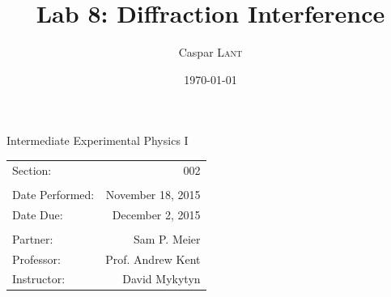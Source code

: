 \documentclass[double]{amsart}
\title{Lab 8: Diffraction Interference}
\author{ Caspar \textsc{Lant}} %
\date{\today} %
\begin{document}
\bigskip

\maketitle %
\begin{center}

Intermediate Experimental Physics I\\
\vspace{1.5cm}

\begin{tabular}{l r}

Section: & 002\\
\\
Date Performed: & November 18, 2015 \\ %
Date Due: & December 2, 2015\\
\\
Partner: & Sam P. Meier \\ %
Professor: & Prof. Andrew Kent\\ 
Instructor: & David Mykytyn %
\end{tabular}
\end{center}
\vspace{50mm}
\pagebreak
\end{document}
